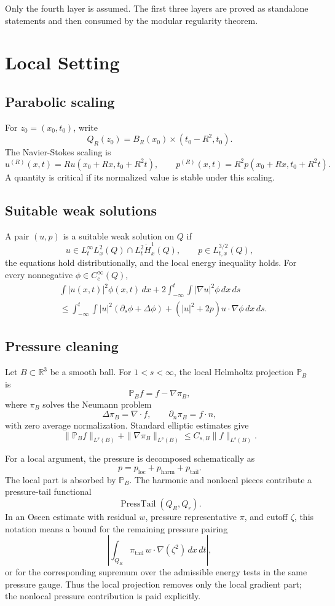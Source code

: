 \documentclass[11pt]{article}
\begin{document}
Only the fourth layer is assumed.  The first three layers are proved as
standalone statements and then consumed by the modular regularity theorem.

\section{Local Setting}

\subsection{Parabolic scaling}

For \(z_0=(x_0,t_0)\), write
\[
Q_R(z_0)=B_R(x_0)\times(t_0-R^2,t_0).
\]
The Navier-Stokes scaling is
\[
u^{(R)}(x,t)=R u(x_0+Rx,t_0+R^2t),
\qquad
p^{(R)}(x,t)=R^2p(x_0+Rx,t_0+R^2t).
\]
A quantity is critical if its normalized value is stable under this scaling.

\subsection{Suitable weak solutions}

A pair \((u,p)\) is a suitable weak solution on \(Q\) if
\[
u\in L^\infty_tL^2_x(Q)\cap L^2_t\dot H^1_x(Q),
\qquad
p\in L^{3/2}_{t,x}(Q),
\]
the equations hold distributionally, and the local energy inequality holds. For every nonnegative \(\phi\in C_c^\infty(Q)\),
\[
\begin{aligned}
&\int |u(x,t)|^2\phi(x,t)\,dx
+2\int_{-\infty}^t\int |\nabla u|^2\phi\,dx\,ds\\
&\le
\int_{-\infty}^t\int
|u|^2(\partial_s\phi+\Delta\phi)
+(|u|^2+2p)u\cdot\nabla\phi\,dx\,ds.
\end{aligned}
\]

\subsection{Pressure cleaning}

Let \(B\subset\mathbb R^3\) be a smooth ball. For \(1<s<\infty\), the local Helmholtz projection \(\mathbb P_B\) is
\[
\mathbb P_B f=f-\nabla \pi_B,
\]
where \(\pi_B\) solves the Neumann problem
\[
\Delta \pi_B=\nabla\cdot f,
\qquad
\partial_n\pi_B=f\cdot n,
\]
with zero average normalization. Standard elliptic estimates give
\[
\|\mathbb P_B f\|_{L^s(B)}+\|\nabla\pi_B\|_{L^s(B)}
\le C_{s,B}\|f\|_{L^s(B)}.
\]

For a local argument, the pressure is decomposed schematically as
\[
p=p_{\mathrm{loc}}+p_{\mathrm{harm}}+p_{\mathrm{tail}}.
\]
The local part is absorbed by \(\mathbb P_B\). The harmonic and nonlocal pieces contribute a pressure-tail functional
\[
\operatorname{PressTail}(Q_R,Q_r).
\]
In an Oseen estimate with residual \(w\), pressure representative \(\pi\), and
cutoff \(\zeta\), this notation means a bound for the remaining pressure pairing
\[
\left|
\int_{Q_R}\pi_{\mathrm{tail}}\,w\cdot\nabla(\zeta^2)\,dx\,dt
\right|,
\]
or for the corresponding supremum over the admissible energy tests in the same
pressure gauge.  Thus the local projection removes only the local gradient part;
the nonlocal pressure contribution is paid explicitly.
\end{document}
